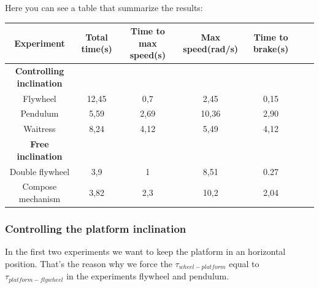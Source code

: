 Here you can see a table that summarize the results:
\begin{center}
	\begin{tabular}{ |c|c|c|c|c|c|c| } 
	 \hline
	 \textbf{Experiment} & \textbf{Total time(s)} & \textbf{Time to max speed(s)} 
	 & \textbf{Max speed(rad/s)} & \textbf{Time to brake(s)}\\
	 \hline
	 \textbf{Controlling inclination} \\
	 \hline
	 Flywheel & 12,45 & 0,7 & 2,45 & 0,15\\
	 \hline
	 Pendulum & 5,59 & 2,69 & 10,36 & 2,90\\
	 \hline
	 Waitress & 8,24 & 4,12 & 5,49 & 4,12\\
	 \hline
	 \textbf{Free inclination} \\
	 \hline
	 Double flywheel & 3,9 & 1 & 8,51 & 0.27\\
	 \hline
	 Compose mechanism & 3,82 & 2,3 & 10,2 & 2,04\\
	 \hline
	\end{tabular}
\end{center}

\subsubsection{Controlling the platform inclination}
In the first two experiments we want to keep the platform in an horizontal position.
That's the reason why we force the $ \tau_{wheel-platform}$ equal to
$\tau_{platform-flywheel}$ in the experiments flywheel and pendulum.

